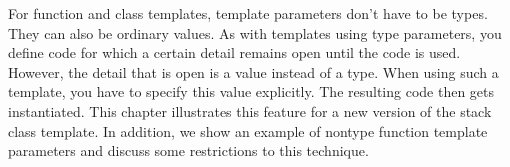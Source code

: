 For function and class templates, template parameters don’t have to be types. They can also be ordinary values. As with templates using type parameters, you define code for which a certain detail remains open until the code is used. However, the detail that is open is a value instead of a type. When using such a template, you have to specify this value explicitly. The resulting code then gets instantiated. This chapter illustrates this feature for a new version of the stack class template. In addition, we show an example of nontype function template parameters and discuss some restrictions to this technique.